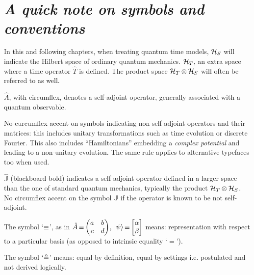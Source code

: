 \section*{\large\it A quick note on symbols and conventions}

\small

In this and following chapters, when treating quantum time models,
$\mathcal{H}_S$ will indicate the Hilbert space of ordinary quantum mechanics.
$\mathcal{H}_T$, an extra space where a time operator $\hat{T}$ is defined. The product space $\mathcal{H}_T \otimes \mathcal{H}_S$
will often be referred to as well.

$\hat{A}$, with circumflex, denotes a self-adjoint operator, generally associated with a quantum observable.

No curcumflex accent on symbols indicating non self-adjoint operators and their matrices:
this includes unitary transformations such as
time evolution or discrete Fourier.
This also includes ``Hamiltonians'' embedding a \emph{complex potential}
and leading to a non-unitary evolution. The same rule applies to alternative typefaces too when used.

$\hat{\mathbb{J}}$ (blackboard bold) indicates a self-adjoint operator defined in
a larger space than the one of standard quantum mechanics,
typically the product $\mathcal{H}_T \otimes \mathcal{H}_S$.
No circumflex accent on the symbol ${\mathbb{J}}$ if the operator is
known to be not self-adjoint.

The symbol `$\operatorname*{\equiv}$', as in $\hat{A} \repr \mqty(a&b\\c&d)$, $\ket{\psi} \repr \mqty[\alpha \\ \beta]$
means: representation with respect to a particular basis (as opposed to intrinsic equality `$=$').

The symbol `$\triangleq$'
means: equal by definition, equal by settings i.e. postulated and not derived logically.

\normalsize



